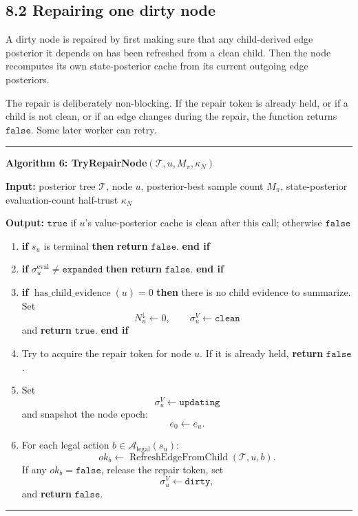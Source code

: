 \documentclass[11pt]{article}
\newcommand{\Tree}{\mathcal{T}}
\newcommand{\Legal}{\mathcal{A}_{\mathrm{legal}}}
\newcommand{\RefreshEdgeFromChild}{\operatorname{RefreshEdgeFromChild}}
\newenvironment{algorithmblock}[1]
{
  \par\medskip
  \noindent\hrule\par\smallskip
  \noindent\textbf{#1}
  \par\smallskip
}
{
  \par\smallskip\noindent\hrule\par\medskip
}
\newcommand{\Input}{\textbf{Input: }}
\newcommand{\Output}{\textbf{Output: }}
\newcommand{\Return}{\textbf{return }}
\newcommand{\If}{\textbf{if }}
\newcommand{\Then}{\textbf{ then }}
\newcommand{\EndIf}{\textbf{end if}}
\begin{document}
\subsection*{8.2 Repairing one dirty node}

A dirty node is repaired by first making sure that any child-derived edge
posterior it depends on has been refreshed from a clean child. Then the node
recomputes its own state-posterior cache from its current outgoing edge
posteriors.

The repair is deliberately non-blocking. If the repair token is already held, or
if a child is not clean, or if an edge changes during the repair, the function
returns \(\texttt{false}\). Some later worker can retry.

\begin{algorithmblock}{Algorithm 6: TryRepairNode\((\Tree,u,M_\pi,\kappa_N)\)}

\Input posterior tree \(\Tree\), node \(u\), posterior-best sample count \(M_\pi\), state-posterior evaluation-count half-trust \(\kappa_N\)

\Output \(\texttt{true}\) if \(u\)'s value-posterior cache is clean after this call; otherwise \(\texttt{false}\)

\begin{enumerate}[leftmargin=2em]
  \item \If \(s_u\) is terminal \Then \Return \(\texttt{false}\). \EndIf

  \item \If \(\sigma^{\mathrm{eval}}_u\ne\texttt{expanded}\) \Then \Return \(\texttt{false}\). \EndIf

  \item \If \(\operatorname{has\_child\_evidence}(u)=0\) \Then
  there is no child evidence to summarize. Set
  \[
  N^\downarrow_u\gets 0,
  \qquad
  \sigma^V_u\gets\texttt{clean}
  \]
  and \Return \(\texttt{true}\). \EndIf

  \item Try to acquire the repair token for node \(u\). If it is already held,
  \Return \(\texttt{false}\).

  \item Set
  \[
  \sigma^V_u\gets\texttt{updating}
  \]
  and snapshot the node epoch:
  \[
  e_0\gets e_u.
  \]

  \item For each legal action \(b\in\Legal(s_u)\):
  \[
  ok_b\gets\RefreshEdgeFromChild(\Tree,u,b).
  \]
  If any \(ok_b=\texttt{false}\), release the repair token, set
  \[
  \sigma^V_u\gets\texttt{dirty},
  \]
  and \Return \(\texttt{false}\).


\end{enumerate}
\end{algorithmblock}
\end{document}
